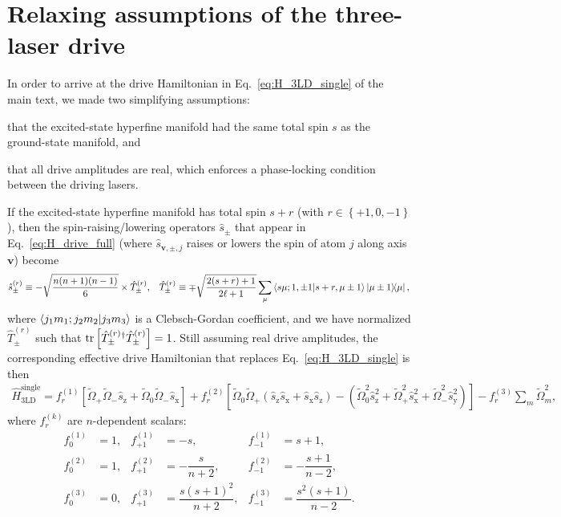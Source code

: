 \documentclass[aps,pra,nofootinbib,twocolumn,superscriptaddress]{revtex4-2}
\renewcommand{\t}{\text} %
\newcommand{\f}[2]{\dfrac{#1}{#2}} %
\newcommand{\p}[1]{\left(#1\right)} %
\renewcommand{\sp}[1]{\left[#1\right]} %
\renewcommand{\set}[1]{\left\{#1\right\}} %
\newcommand{\bk}{\braket} %
\renewcommand{\v}{\bm} %
\newcommand{\1}{\mathds{1}}
\newcommand{\s}{\hat s}
\renewcommand{\H}{\hat H}
\newcommand{\x}{\text{x}}
\newcommand{\y}{\text{y}}
\newcommand{\z}{\text{z}}
\begin{document}
\section{Relaxing assumptions of the three-laser drive}
\label{sec:full_drive}

In order to arrive at the drive Hamiltonian in Eq.~\eqref{eq:H_3LD_single} of the main text, we made two simplifying assumptions:
\begin{enumerate*}
\item that the excited-state hyperfine manifold had the same total spin $s$ as the ground-state manifold, and
\item that all drive amplitudes are real, which enforces a phase-locking condition between the driving lasers.
\end{enumerate*}
If the excited-state hyperfine manifold has total spin $s+r$ (with $r\in\set{+1,0,-1}$), then the spin-raising/lowering operators $\s_\pm$ that appear in Eq.~\eqref{eq:H_drive_full} (where $\s_{\v v,\pm,j}$ raises or lowers the spin of atom $j$ along axis $\v v$) become
\begin{align}
  \s_\pm^{(r)}
  \equiv -\sqrt{\f{n(n+1)(n-1)}{6}} \times \hat T_\pm^{(r)},
  &&
  \hat T_\pm^{(r)} \equiv \mp\sqrt{\f{2(s+r)+1}{2\ell+1}}
  \sum_\mu \bk{s\mu;1,\pm1|s+r,\mu\pm1} \op{\mu\pm1}{\mu},
\end{align}
where $\bk{j_1m_1;j_2m_2|j_3m_3}$ is a Clebsch-Gordan coefficient, and we have normalized $\hat T_\pm^{(r)}$ such that $\tr\sp{\hat T_\pm^{(r)}{}^\dag \hat T_\pm^{(r)}}=1$.
Still assuming real drive amplitudes, the corresponding effective drive Hamiltonian that replaces Eq.~\eqref{eq:H_3LD_single} is then
\begin{align}
  \H_{\t{3LD}}^{\t{single}}
  = f_r^{(1)} \sp{\tilde\Omega_+ \tilde\Omega_- \s_\z
    + \tilde\Omega_0 \tilde\Omega_- \s_\x}
  + f_r^{(2)} \sp{\tilde\Omega_0 \tilde\Omega_+
    (\s_\z \s_\x  + \s_\x \s_\z)
    - \p{\tilde\Omega_0^2 \s_\z^2
      + \tilde\Omega_+^2 \s_\x^2
      + \tilde\Omega_-^2 \s_\y^2}}
  - f_r^{(3)} \sum_m \tilde\Omega_m^2,
\end{align}
where $f_r^{(k)}$ are $n$-dependent scalars:
\begin{align}
  f_0^{(1)} &= 1, &
  f_{+1}^{(1)} &= -s, &
  f_{-1}^{(1)} &= s+1, \\
  f_0^{(2)} &= 1, &
  f_{+1}^{(2)} &= -\f{s}{n+2}, &
  f_{-1}^{(2)} &= -\f{s+1}{n-2}, \\
  f_0^{(3)} &= 0, &
  f_{+1}^{(3)} &= \f{s(s+1)^2}{n+2}, &
  f_{-1}^{(3)} &= \f{s^2(s+1)}{n-2}.
\end{align}
\end{document}
